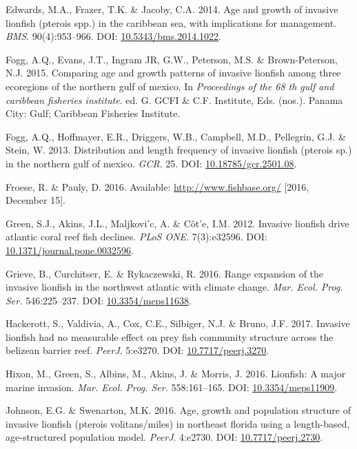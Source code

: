 \documentclass[12pt,]{article}
\begin{document}
\hypertarget{ref-edwards_2014}{}
Edwards, M.A., Frazer, T.K. \& Jacoby, C.A. 2014. Age and growth of
invasive lionfish (pterois spp.) in the caribbean sea, with implications
for management. \emph{BMS}. 90(4):953--966. DOI:
\href{https://doi.org/10.5343/bms.2014.1022}{10.5343/bms.2014.1022}.

\hypertarget{ref-fogg_2015}{}
Fogg, A.Q., Evans, J.T., Ingram JR, G.W., Peterson, M.S. \&
Brown-Peterson, N.J. 2015. Comparing age and growth patterns of invasive
lionfish among three ecoregions of the northern gulf of mexico. In
\emph{Proceedings of the 68 th gulf and caribbean fisheries institute}.
ed. G. GCFI \& C.F. Institute, Eds. (nos.). Panama City: Gulf; Caribbean
Fisheries Institute.

\hypertarget{ref-fogg_2013}{}
Fogg, A.Q., Hoffmayer, E.R., Driggers, W.B., Campbell, M.D., Pellegrin,
G.J. \& Stein, W. 2013. Distribution and length frequency of invasive
lionfish (pterois sp.) in the northern gulf of mexico. \emph{GCR}. 25.
DOI: \href{https://doi.org/10.18785/gcr.2501.08}{10.18785/gcr.2501.08}.

\hypertarget{ref-froese_website_2016}{}
Froese, R. \& Pauly, D. 2016. Available: \url{http://www.fishbase.org/}
{[}2016, December 15{]}.

\hypertarget{ref-green_2012}{}
Green, S.J., Akins, J.L., Maljkovi\a'c, A. \& Côt\a'e, I.M. 2012.
Invasive lionfish drive atlantic coral reef fish declines. \emph{PLoS
ONE}. 7(3):e32596. DOI:
\href{https://doi.org/10.1371/journal.pone.0032596}{10.1371/journal.pone.0032596}.

\hypertarget{ref-grieve_2016}{}
Grieve, B., Curchitser, E. \& Rykaczewski, R. 2016. Range expansion of
the invasive lionfish in the northwest atlantic with climate change.
\emph{Mar. Ecol. Prog. Ser.} 546:225--237. DOI:
\href{https://doi.org/10.3354/meps11638}{10.3354/meps11638}.

\hypertarget{ref-hackerott_2017}{}
Hackerott, S., Valdivia, A., Cox, C.E., Silbiger, N.J. \& Bruno, J.F.
2017. Invasive lionfish had no measurable effect on prey fish community
structure across the belizean barrier reef. \emph{PeerJ}. 5:e3270. DOI:
\href{https://doi.org/10.7717/peerj.3270}{10.7717/peerj.3270}.

\hypertarget{ref-hixon_2016}{}
Hixon, M., Green, S., Albins, M., Akins, J. \& Morris, J. 2016.
Lionfish: A major marine invasion. \emph{Mar. Ecol. Prog. Ser.}
558:161--165. DOI:
\href{https://doi.org/10.3354/meps11909}{10.3354/meps11909}.

\hypertarget{ref-johnson_2016}{}
Johnson, E.G. \& Swenarton, M.K. 2016. Age, growth and population
structure of invasive lionfish (pterois volitans/miles) in northeast
florida using a length-based, age-structured population model.
\emph{PeerJ}. 4:e2730. DOI:
\href{https://doi.org/10.7717/peerj.2730}{10.7717/peerj.2730}.
\end{document}
